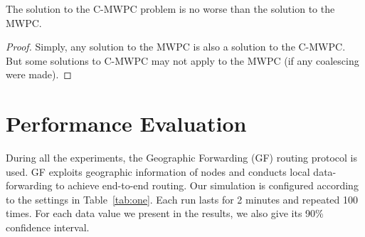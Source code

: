 \documentclass[prodmode,acmtecs]{acmsmall}
\begin{document}
\begin{algorithm}
\begin{algorithmic}[1]
\begin{lemma}The solution to the C-MWPC problem is no
worse than the solution to the MWPC.
\end{lemma}
\begin{proof}
Simply, any solution to the MWPC is also a solution to the
C-MWPC. But some solutions to C-MWPC may not apply to the MWPC (if any
coalescing were made).
\end{proof}

\section{Performance Evaluation}

During all the experiments, the Geographic Forwarding (GF)
\cite{Akyildiz-01} routing protocol is used. GF exploits geographic
information of nodes and conducts local data-forwarding to achieve
end-to-end routing. Our simulation is
configured according to the settings in
Table~\ref{tab:one}. Each run lasts for 2 minutes and
repeated 100 times. For each data value we present in the results,
we also give its 90\% confidence interval.
\begin{table}%
\begin{tabnote}%
\vskip2pt
\end{tabnote}%
\end{table}%


\end{algorithmic}
\end{algorithm}
\end{document}
